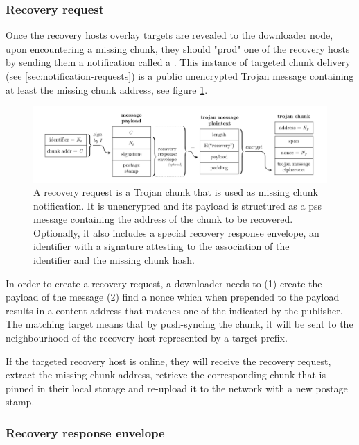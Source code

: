 \subsubsection{Recovery request}

Once the recovery hosts overlay targets are revealed to the downloader node, upon encountering a missing chunk, they should "prod" one of the recovery hosts by sending them a notification called a . This instance of targeted chunk delivery (see \ref{sec:notification-requests}) is a public unencrypted Trojan message containing at least the missing chunk address, see figure \ref{fig:recovery-request}.

\begin{figure}[htbp]
  \centering
  \includegraphics[width=\textwidth]{fig/recovery-request.pdf}
  \caption[Recovery request \statusgreen]{A recovery request is a Trojan chunk that is used as missing chunk notification. It is unencrypted and its payload is structured as a pss message containing the address of the chunk to be recovered. Optionally, it also includes a special recovery response envelope, an identifier with a signature attesting to the association of the identifier and the missing chunk hash.}
  \label{fig:recovery-request}
\end{figure}

In order to create a recovery request, a downloader needs to (1) create the payload of the message (2) find a nonce which when prepended to the payload results in a content address that matches one of the  indicated by the publisher. The matching target means that by push-syncing the chunk, it will be sent to the neighbourhood of the recovery host represented by a target prefix. 

If the targeted recovery host is online, they will receive the recovery request, extract the missing chunk address, retrieve the corresponding chunk that is pinned in their local storage and re-upload it to the network with a new postage stamp.

\subsubsection{Recovery response envelope}

